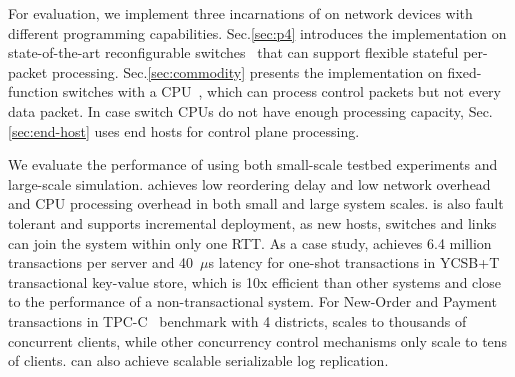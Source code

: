 For evaluation, we implement three incarnations of \sys on network devices with different programming capabilities.
Sec.\ref{sec:p4} introduces the implementation on state-of-the-art reconfigurable switches~\cite{tofino,cavium} that can support flexible stateful per-packet processing.
Sec.\ref{sec:commodity} presents the implementation on fixed-function switches with a CPU~\cite{arista}, which can process control packets but not every data packet.
In case switch CPUs do not have enough processing capacity, Sec.\ref{sec:end-host} uses end hosts for control plane processing.



We evaluate the performance of \sys using both small-scale testbed experiments and large-scale simulation.
\sys achieves low reordering delay and low network overhead and CPU processing overhead in both small and large system scales.
\sys is also fault tolerant and supports incremental deployment, as new hosts, switches and links can join the system within only one RTT.
As a case study, \sys achieves 6.4 million transactions per server and 40~$\mu$s latency for one-shot transactions in YCSB+T~\cite{dey2014ycsbt} transactional key-value store, which is 10x efficient than other systems and close to the performance of a non-transactional system.
For New-Order and Payment transactions in TPC-C~\cite{tpcc} benchmark with 4 districts, \sys scales to thousands of concurrent clients, while other concurrency control mechanisms only scale to tens of clients.
\sys can also achieve scalable serializable log replication.

